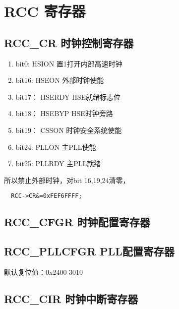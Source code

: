 \section{RCC 寄存器}

\subsection{RCC\_CR 时钟控制寄存器}

\begin{enumerate}
  \item bit0: HSION 置1打开内部高速时钟
  \item bit16: HSEON 外部时钟使能
  \item bit17： HSERDY HSE就绪标志位
  \item bit18： HSEBYP HSE时钟旁路
  \item bit19： CSSON 时钟安全系统使能
  \item bit24: PLLON 主PLL使能
  \item bit25: PLLRDY 主PLL就绪
\end{enumerate}

所以禁止外部时钟，对bit 16,19,24清零，
\begin{verbatim}
  RCC->CR&=0xFEF6FFFF;
\end{verbatim}


\subsection{RCC\_CFGR 时钟配置寄存器}

\subsection{RCC\_PLLCFGR PLL配置寄存器}
默认复位值：0x2400 3010

\subsection{RCC\_CIR 时钟中断寄存器}